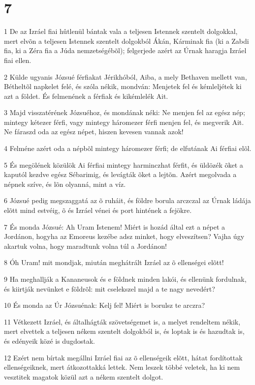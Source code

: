 \chapter{7}

\par 1 De az Izráel fiai hûtlenül bántak vala a teljesen Istennek szentelt dolgokkal, mert elvõn a teljesen Istennek szentelt dolgokból Ákán, Kárminak  fia (ki a Zabdi fia, ki a Zéra fia a Júda nemzetségébõl); felgerjede azért az Úrnak haragja Izráel fiai ellen.
\par 2 Külde ugyanis Józsué férfiakat Jérikhóból, Aiba, a mely Bethaven mellett van, Bétheltõl napkelet felé, és szóla nékik, mondván: Menjetek fel és kémleljétek ki azt a földet. És felmenének a férfiak és kikémlelék Ait.
\par 3 Majd visszatérének Józsuéhoz, és mondának néki: Ne menjen fel az egész nép; mintegy kétezer férfi, vagy mintegy háromezer férfi menjen fel, és megverik Ait. Ne fáraszd oda az egész népet, hiszen kevesen vannak azok!
\par 4 Felméne azért oda a népbõl mintegy háromezer férfi; de elfutának Ai férfiai elõl.
\par 5 És megölének közülök Ai férfiai mintegy harminczhat férfit, és üldözék õket a kaputól kezdve egész Sébarimig, és levágták õket a lejtõn. Azért megolvada a népnek szíve, és lõn olyanná, mint a víz.
\par 6 Józsué pedig megszaggatá az õ ruháit, és földre borula arczczal az Úrnak ládája elõtt mind estvéig, õ és Izráel vénei és port hintének a fejökre.
\par 7 És monda Józsué: Ah Uram Istenem! Miért is hozád által ezt a népet a Jordánon, hogyha az Emoreus kezébe adsz minket, hogy elveszítsen? Vajha úgy akartuk volna, hogy maradtunk volna túl a Jordánon!
\par 8 Óh Uram! mit mondjak, miután meghátrált Izráel az õ ellenségei elõtt!
\par 9 Ha meghallják a Kananeusok és e földnek minden lakói, és ellenünk fordulnak, és kiirtják nevünket e földrõl: mit cselekszel majd a te nagy nevedért?
\par 10 És monda az Úr Józsuénak: Kelj fel! Miért is borulsz te arczra?
\par 11 Vétkezett Izráel, és általhágták szövetségemet is, a melyet rendeltem nékik, mert elvettek a teljesen nékem szentelt dolgokból is, és loptak is és hazudtak is, és edényeik közé is dugdostak.
\par 12 Ezért nem bírtak megállni Izráel fiai az õ ellenségeik elõtt, hátat fordítottak ellenségeiknek, mert átkozottakká lettek. Nem leszek többé veletek, ha ki nem vesztitek magatok közül azt a nékem szentelt dolgot.

